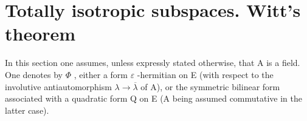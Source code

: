 \section{Totally isotropic subspaces. Witt's theorem}

In this section one assumes, unless expressly stated otherwise, that A is a field. One denotes by \(\Phi\) , either a form \(\varepsilon\) -hermitian on E (with respect to the involutive antiautomorphism \(\lambda \to \overline{\lambda}\) of A), or the symmetric bilinear form associated with a quadratic form Q on E (A being assumed commutative in the latter case).

